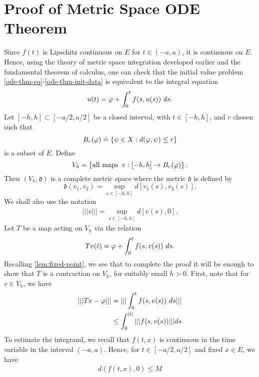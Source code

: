 \section{Proof of Metric Space ODE Theorem}
	Since $f(t)$ is Lipschitz continuous on $E$ for $t \in (-a, a)$, it is
	continuous on $E$. Hence, using the theory of metric space integration
  developed earlier and the fundamental theorem of calculus,
  one can check that the initial value problem
  \eqref{ode-thm-eq}-\eqref{ode-thm-init-data} is equivalent to the
	integral equation
	\begin{equation*}
		\begin{split}
			u(t) = \varphi + \int_0^t f(s, u(s) ) \ ds.
		\end{split}
	\end{equation*}
	Let $[-h, h] \subset [-a/2, a/2]$ be a closed interval, with $t \in [-h, h]$,
	and $r$ chosen such that
	$$B_r(\varphi) \doteq \left\{ \psi \in X: d(\varphi, \psi) \le r \right\}$$
	is a subset of $E$. Define 
	$$V_h = \left\{ \text{all maps} \; \;  v: [-h, h]
    \to B_r(\varphi)\right\}.$$ Then $(V_h, \mathfrak{d})$ is a complete metric space
    where the metric $\mathfrak{d}$ is defined by
    $$\mathfrak{d}(v_{1}, v_{2}) = \sup_{s \in [-h,
    h]} d[v_1(s),v_2(s)].$$ 
    We shall also use the notation
    \begin{equation*}
    \begin{split}
    ||| v ||| = \sup_{s \in [-h,
    h]} d[v(s),0]. 
    \end{split}
    \end{equation*}
    Let $T$ be a map
	acting on $V_h$ via the relation $$Tv(t) = \varphi + \int_0^t f(s, v(s) ) \ ds.$$
	Recalling \autoref{lem:fixed-point}, we see that to complete the proof it will be enough to show that $T$ is a contraction on
	$V_h$, for suitably small $h >0$. First, note that for $v \in V_h$, we have
\begin{equation}
	\label{cont-map-into}
	\begin{split}
		| | | Tv - \varphi| | |
		& = | | | \int_0^t f(s, v(s) ) \ ds | | |
		\\
    & \le  \int_0^{|t|} | | | f(s, v(s) ) | | | ds
    \end{split}
    \end{equation}
To estimate the integrand, we recall that $f(t, x)$ is continuous in the time
variable in the interval $(-a, a)$. Hence, for $t \in [-a/2, a/2]$ and fixed $x
\in E$, we have
%
%
\begin{equation*}
\begin{split}
d(f(t, x), 0) \le M
\end{split}
\end{equation*}
